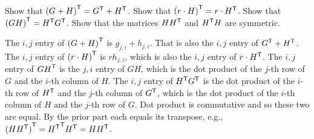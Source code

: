 
\begin{Exercise}[
name={},
title={}, 
difficulty=0,
origin={\cite{JH}}]
\Question Show that \( {{(G+H)}^{\mathsf{T}}}={{G}^{\mathsf{T}}}+{{H}^{\mathsf{T}}} \).
\Question Show that \( {{(r\cdot H)}^{\mathsf{T}}}=r\cdot{{H}^{\mathsf{T}}} \).
\Question Show that \( {{(GH)}^{\mathsf{T}}}={{H}^{\mathsf{T}}}{{G}^{\mathsf{T}}} \).
\Question Show that the matrices \( H{{H}^{\mathsf{T}}} \) and \( {{H}^{\mathsf{T}}}H \) are symmetric.
\end{Exercise}

\begin{Answer}
        \Question The \( i,j \) entry of \( {{(G+H)}^{\mathsf{T}}} \) is
          \( g_{j,i}+h_{j,i} \).
          That is also the \( i,j \) entry of \( {{G}^{\mathsf{T}}}+{{H}^{\mathsf{T}}} \).
        \Question The \( i,j \) entry of \( {{(r\cdot H)}^{\mathsf{T}}} \) is
          \( rh_{j,i} \),
          which is also the \( i,j \) entry of \( r\cdot{{H}^{\mathsf{T}}} \).
        \Question  The \( i,j \) entry of \( {{GH}^{\mathsf{T}}} \) is the $j,i$ entry
          of $GH$, which is the dot product of the
          \( j \)-th row of \( G \) and the \( i \)-th column of \( H \).
          The \( i,j \) entry of \( {{H}^{\mathsf{T}}}{{G}^{\mathsf{T}}} \) is the dot product of
          the \( i \)-th row of \( {{H}^{\mathsf{T}}} \) and the \( j \)-th column of
          \( {{G}^{\mathsf{T}}} \), which is the
          dot product of the \( i \)-th column of \( H \) and the
          \( j \)-th row of \( G \).
          Dot product is commutative and so these two are equal.
        \Question By the prior part each equals its transpose, e.g.,
          ${{(H{{H}^{\mathsf{T}}})}^{\mathsf{T}}}={{{{H}^{\mathsf{T}}}}^{\mathsf{T}}}{{H}^{\mathsf{T}}}=H{{H}^{\mathsf{T}}}$.
\end{Answer}
